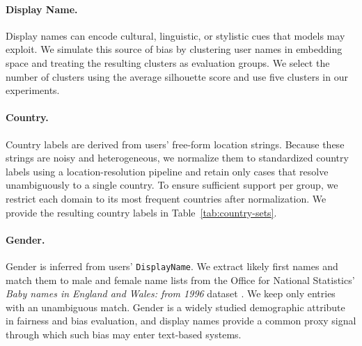 \documentclass[11pt]{article}
\begin{document}
\paragraph{Display Name.}

Display names can encode cultural, linguistic, or stylistic cues that models may exploit. We simulate this source of bias by clustering user names in embedding space and treating the resulting clusters as evaluation groups. We select the number of clusters using the average silhouette score and use five clusters in our experiments.


\paragraph{Country.}
Country labels are derived from users' free-form location strings. Because these strings are noisy and heterogeneous, we normalize them to standardized country labels using a location-resolution pipeline and retain only cases that resolve unambiguously to a single country. To ensure sufficient support per group, we restrict each domain to its most frequent countries after normalization. We provide the resulting country labels in Table~\ref{tab:country-sets}.

\begin{table}[th!]
\centering
{}
\caption{\textbf{Country labels retained for each Stack Exchange dataset.}
Country labels are obtained by normalizing users' free-form location strings and retaining the five most frequent countries in each dataset.}
\label{tab:country-sets}
\end{table}

\paragraph{Gender.}
Gender is inferred from users' \texttt{DisplayName}. We extract likely first names and match them to male and female name lists from the Office for National Statistics' \emph{Baby names in England and Wales: from 1996} dataset \citep{ons_babynames_2025}. We keep only entries with an unambiguous match. Gender is a widely studied demographic attribute in fairness and bias evaluation, and display names provide a common proxy signal through which such bias may enter text-based systems.
\end{document}
